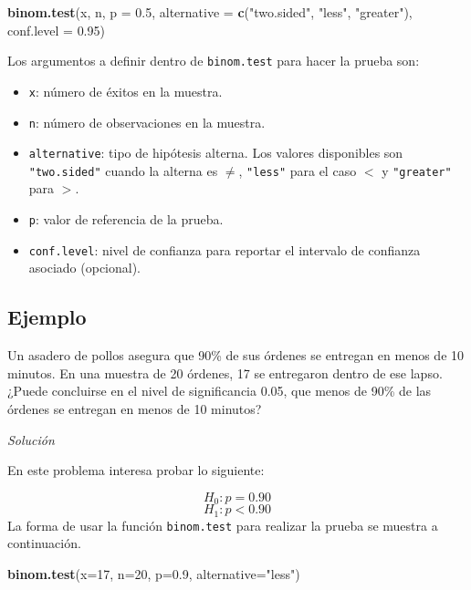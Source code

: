\documentclass[10pt,]{krantz}
\makeatletter
\newenvironment{Shaded}{\begin{snugshade}}{\end{snugshade}}
\newcommand{\KeywordTok}[1]{\textcolor[rgb]{0.13,0.29,0.53}{\textbf{#1}}}
\newcommand{\DataTypeTok}[1]{\textcolor[rgb]{0.13,0.29,0.53}{#1}}
\newcommand{\DecValTok}[1]{\textcolor[rgb]{0.00,0.00,0.81}{#1}}
\newcommand{\FloatTok}[1]{\textcolor[rgb]{0.00,0.00,0.81}{#1}}
\newcommand{\StringTok}[1]{\textcolor[rgb]{0.31,0.60,0.02}{#1}}
\newcommand{\NormalTok}[1]{#1}
\providecommand{\tightlist}{%
  \setlength{\itemsep}{0pt}\setlength{\parskip}{0pt}}
\newenvironment{kframe}{%
\medskip{}
\setlength{\fboxsep}{.8em}
 \def\at@end@of@kframe{}%
 \ifinner\ifhmode%
  \def\at@end@of@kframe{\end{minipage}}%
  \begin{minipage}{\columnwidth}%
 \fi\fi%
 \def\FrameCommand##1{\hskip\@totalleftmargin \hskip-\fboxsep
 \colorbox{shadecolor}{##1}\hskip-\fboxsep
     \hskip-\linewidth \hskip-\@totalleftmargin \hskip\columnwidth}%
 \MakeFramed {\advance\hsize-\width
   \@totalleftmargin\z@ \linewidth\hsize
   \@setminipage}}%
 {\par\unskip\endMakeFramed%
 \at@end@of@kframe}
\renewenvironment{Shaded}{\begin{kframe}}{\end{kframe}}
\makeatother
\begin{document}
\begin{Shaded}
\begin{Highlighting}[]
\KeywordTok{binom.test}\NormalTok{(x, n, }\DataTypeTok{p =} \FloatTok{0.5}\NormalTok{,}
           \DataTypeTok{alternative =} \KeywordTok{c}\NormalTok{(}\StringTok{"two.sided"}\NormalTok{, }\StringTok{"less"}\NormalTok{, }\StringTok{"greater"}\NormalTok{),}
           \DataTypeTok{conf.level =} \FloatTok{0.95}\NormalTok{)}
\end{Highlighting}
\end{Shaded}

Los argumentos a definir dentro de \texttt{binom.test} para hacer la
prueba son:

\begin{itemize}
\tightlist
\item
  \texttt{x}: número de éxitos en la muestra.
\item
  \texttt{n}: número de observaciones en la muestra.
\item
  \texttt{alternative}: tipo de hipótesis alterna. Los valores
  disponibles son \texttt{"two.sided"} cuando la alterna es \(\neq\),
  \texttt{"less"} para el caso \(<\) y \texttt{"greater"} para \(>\).
\item
  \texttt{p}: valor de referencia de la prueba.
\item
  \texttt{conf.level}: nivel de confianza para reportar el intervalo de
  confianza asociado (opcional).
\end{itemize}

\subsection*{Ejemplo}\label{ejemplo-67}


Un asadero de pollos asegura que 90\% de sus órdenes se entregan en
menos de 10 minutos. En una muestra de 20 órdenes, 17 se entregaron
dentro de ese lapso. ¿Puede concluirse en el nivel de significancia
0.05, que menos de 90\% de las órdenes se entregan en menos de 10
minutos?

\emph{Solución}

En este problema interesa probar lo siguiente:

\[H_0: p = 0.90\] \[H_1: p < 0.90\] La forma de usar la función
\texttt{binom.test} para realizar la prueba se muestra a continuación.

\begin{Shaded}
\begin{Highlighting}[]
\KeywordTok{binom.test}\NormalTok{(}\DataTypeTok{x=}\DecValTok{17}\NormalTok{, }\DataTypeTok{n=}\DecValTok{20}\NormalTok{, }\DataTypeTok{p=}\FloatTok{0.9}\NormalTok{, }\DataTypeTok{alternative=}\StringTok{"less"}\NormalTok{)}
\end{Highlighting}
\end{Shaded}
\end{document}
